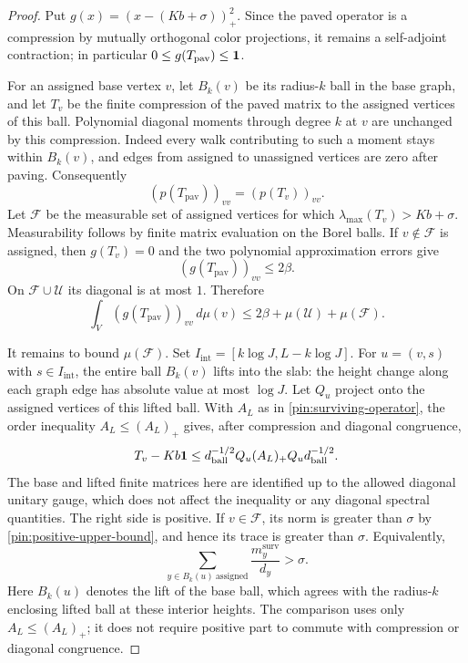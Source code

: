 \begin{proof}
Put $g(x)=(x-(Kb+\sigma))_+^2$.  Since the paved operator is a
compression by mutually orthogonal color projections, it remains a
self-adjoint contraction; in particular $0\leq g(T_{\mathrm{pav}})
\leq\mathbf 1$.

For an assigned base vertex $v$, let $B_k(v)$ be its radius-$k$ ball
in the base graph, and let $T_v$ be the finite compression of the paved
matrix to the assigned vertices of this ball.  Polynomial diagonal
moments through degree $k$ at $v$ are unchanged by this compression.
Indeed every walk contributing to such a moment stays within $B_k(v)$,
and edges from assigned to unassigned vertices are zero after paving.
Consequently
\[
 (p(T_{\mathrm{pav}}))_{vv}=(p(T_v))_{vv}.
\]
Let $\mathcal F$ be the measurable set of assigned vertices for which
$\lambda_{\max}(T_v)>Kb+\sigma$.  Measurability follows by finite
matrix evaluation on the Borel balls.  If $v\notin\mathcal F$ is
assigned, then $g(T_v)=0$ and the two polynomial approximation errors
give
\[
 (g(T_{\mathrm{pav}}))_{vv}\leq2\beta.
\]
On $\mathcal F\cup\mathcal U$ its diagonal is at most $1$.  Therefore
\begin{equation}\label{pin:failure-reduction}
 \int_V(g(T_{\mathrm{pav}}))_{vv}\,d\mu(v)
 \leq2\beta+\mu(\mathcal U)+\mu(\mathcal F).
\end{equation}

It remains to bound $\mu(\mathcal F)$.  Set
$I_{\mathrm{int}}=[k\log J,L-k\log J]$.
For $u=(v,s)$ with $s\in I_{\mathrm{int}}$, the entire ball $B_k(v)$
lifts into the slab: the height change along each graph edge has
absolute value at most $\log J$.  Let $Q_u$ project onto the assigned
vertices of this lifted ball.  With $A_L$ as in
\eqref{pin:surviving-operator}, the order inequality $A_L\leq(A_L)_+$
gives, after compression and diagonal congruence,
\begin{equation}\label{pin:positive-upper-bound}
 T_v-Kb\mathbf 1
 \leq d_{\mathrm{ball}}^{-1/2}Q_u(A_L)_+Q_u
                                  d_{\mathrm{ball}}^{-1/2}.
\end{equation}
The base and lifted finite matrices here are identified up to the
allowed diagonal unitary gauge, which does not affect the inequality
or any diagonal spectral quantities.  The right side is positive.
If $v\in\mathcal F$, its norm is greater than $\sigma$ by
\eqref{pin:positive-upper-bound}, and hence its trace is greater than
$\sigma$.  Equivalently,
\begin{equation}\label{pin:failure-trace}
 \sum_{y\in B_k(u)\ \mathrm{assigned}}
                \frac{m_y^{\mathrm{surv}}}{d_y}>\sigma.
\end{equation}
Here $B_k(u)$ denotes the lift of the base ball, which agrees with the
radius-$k$ enclosing lifted ball at these interior heights.  The
comparison uses only $A_L\leq(A_L)_+$; it does not require positive
part to commute with compression or diagonal congruence.


\end{proof}
